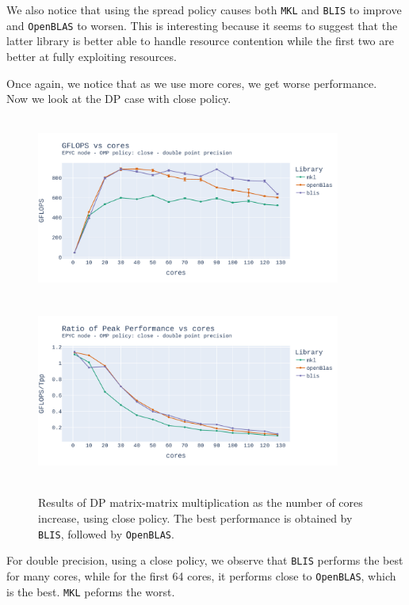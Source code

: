\documentclass{report}
\begin{document}
We also notice that using the spread policy causes both \texttt{MKL} and \texttt{BLIS}
to improve and \texttt{OpenBLAS} to worsen. This is interesting because it seems 
to suggest that the latter library is better able to handle resource contention 
while the first two are better at fully exploiting resources.

Once again, we notice that as we use more cores, we get worse performance.
\\
Now we look at the DP case with close policy.

\begin{figure}[H]
\hspace*{-2.5cm}
\includegraphics[width=10cm, height=6cm]{./images/fixed_size_epyc_double_gflops_close.pdf}
\includegraphics[width=10cm, height=6cm]{./images/fixed_size_epyc_double_gflops_close_ratio.pdf}
\caption{\label{fig:fixed_size_epyc_double_close} Results of DP matrix-matrix multiplication 
as the number of cores increase, using close policy. The best performance is 
obtained by \texttt{BLIS}, followed by \texttt{OpenBLAS}.}
\end{figure}

For double precision, using a close policy, we observe that \texttt{BLIS} 
performs the best for many cores, while for the first 64 cores, it performs close 
to \texttt{OpenBLAS}, which is the best. \texttt{MKL} peforms the worst.
\\
\end{document}
